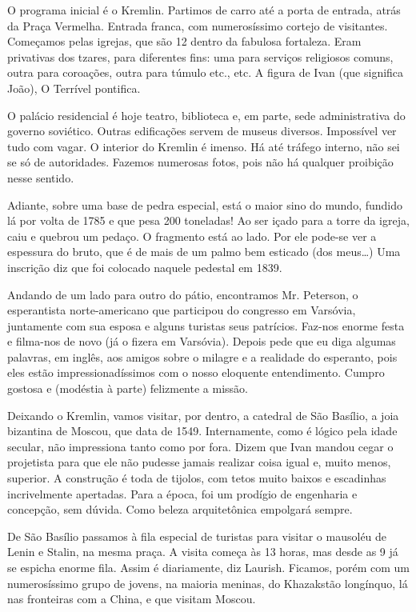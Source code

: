 O programa inicial é o Kremlin. Partimos de carro até a porta de entrada, atrás da Praça Vermelha. Entrada franca, com numerosíssimo cortejo de visitantes. Começamos pelas igrejas, que são 12 dentro da fabulosa fortaleza. Eram privativas dos tzares, para diferentes fins: uma para serviços religiosos comuns, outra para coroações, outra para túmulo etc., etc. A figura de Ivan (que significa João), O Terrível pontifica.

O palácio residencial é hoje teatro, biblioteca e, em parte, sede administrativa do governo soviético. Outras edificações servem de museus diversos. Impossível ver tudo com vagar. O interior do Kremlin é imenso. Há até tráfego interno, não sei se só de autoridades. Fazemos numerosas fotos, pois não há qualquer proibição nesse sentido.

Adiante, sobre uma base de pedra especial, está o maior sino do mundo, fundido lá por volta de 1785 e que pesa 200 toneladas! Ao ser içado para a torre da igreja, caiu e quebrou um pedaço. O fragmento está ao lado. Por ele pode-se ver a espessura do bruto, que é de mais de um palmo bem esticado (dos meus\ldots) Uma inscrição diz que foi colocado naquele pedestal em 1839.

Andando de um lado para outro do pátio, encontramos Mr. Peterson, o esperantista norte-americano que participou do congresso em Varsóvia, juntamente com sua esposa e alguns turistas seus patrícios. Faz-nos enorme festa e filma-nos de novo (já o fizera em Varsóvia). Depois pede que eu diga algumas palavras, em inglês, aos amigos sobre o milagre e a realidade do esperanto, pois eles estão impressionadíssimos com o nosso eloquente entendimento. Cumpro gostosa e (modéstia à parte) felizmente a missão.

Deixando o Kremlin, vamos visitar, por dentro, a catedral de São Basílio, a joia bizantina de Moscou, que data de 1549. Internamente, como é lógico pela idade secular, não impressiona tanto como por fora. Dizem que Ivan mandou cegar o projetista para que ele não pudesse jamais realizar coisa igual e, muito menos, superior. A construção é toda de tijolos, com tetos muito baixos e escadinhas incrivelmente apertadas. Para a época, foi um prodígio de engenharia e concepção, sem dúvida. Como beleza arquitetônica empolgará sempre.

De São Basílio passamos à fila especial de turistas para visitar o mausoléu de Lenin e Stalin, na mesma praça. A visita começa às 13 horas, mas desde as 9 já se espicha enorme fila. Assim é diariamente, diz Laurish. Ficamos, porém com um numerosíssimo grupo de jovens, na maioria meninas, do Khazakstão longínquo, lá nas fronteiras com a China, e que visitam Moscou.

